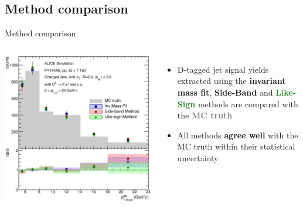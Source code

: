 \documentclass[xcolor={usenames,dvipsnames}]{beamer}
\begin{document}
\subsection{Method comparison}
\begin{frame}{Method comparison}
\begin{columns}
\includegraphics[width=\textwidth]{img/HQ16_Simulation_MethodComparison}
\begin{itemize}
\item D-tagged jet signal yields extracted using the  \textbf{\textcolor{NavyBlue}{invariant mass fit}}, \textbf{\textcolor{BrickRed}{Side-Band}} 
and \textbf{\textcolor{ForestGreen}{Like-Sign}} methods are compared with the \textbf{\textcolor{gray}{MC truth}}
\item All methods \textbf{agree well} with the MC truth within their statistical uncertainty
\end{itemize}
\end{columns}
\end{frame}
\end{document}

